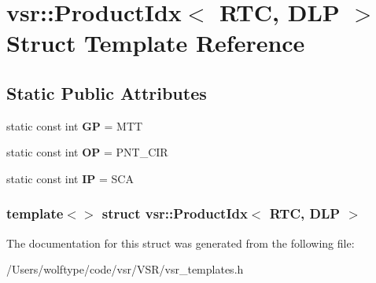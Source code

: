 \hypertarget{structvsr_1_1_product_idx_3_01_r_t_c_00_01_d_l_p_01_4}{\section{vsr\-:\-:Product\-Idx$<$ R\-T\-C, D\-L\-P $>$ Struct Template Reference}
\label{structvsr_1_1_product_idx_3_01_r_t_c_00_01_d_l_p_01_4}
}
\subsection*{Static Public Attributes}
\begin{DoxyCompactItemize}
\item 
\hypertarget{structvsr_1_1_product_idx_3_01_r_t_c_00_01_d_l_p_01_4_a5072a1206092db174487311836670911}{static const int {\bfseries G\-P} = M\-T\-T}\label{structvsr_1_1_product_idx_3_01_r_t_c_00_01_d_l_p_01_4_a5072a1206092db174487311836670911}

\item 
\hypertarget{structvsr_1_1_product_idx_3_01_r_t_c_00_01_d_l_p_01_4_a075d0c4c0069f99c803985d020364abf}{static const int {\bfseries O\-P} = P\-N\-T\-\_\-\-C\-I\-R}\label{structvsr_1_1_product_idx_3_01_r_t_c_00_01_d_l_p_01_4_a075d0c4c0069f99c803985d020364abf}

\item 
\hypertarget{structvsr_1_1_product_idx_3_01_r_t_c_00_01_d_l_p_01_4_a10307b499ae2a3ed69d0a554597d170e}{static const int {\bfseries I\-P} = S\-C\-A}\label{structvsr_1_1_product_idx_3_01_r_t_c_00_01_d_l_p_01_4_a10307b499ae2a3ed69d0a554597d170e}

\end{DoxyCompactItemize}
\subsubsection*{template$<$$>$ struct vsr\-::\-Product\-Idx$<$ R\-T\-C, D\-L\-P $>$}



The documentation for this struct was generated from the following file\-:\begin{DoxyCompactItemize}
\item 
/\-Users/wolftype/code/vsr/\-V\-S\-R/vsr\-\_\-templates.\-h\end{DoxyCompactItemize}
